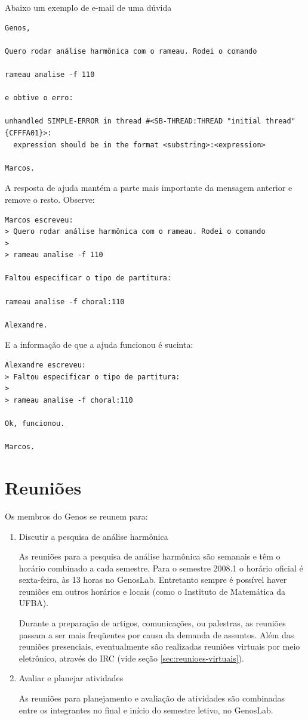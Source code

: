 \documentclass[12pt,brazil]{book}
\begin{document}
Abaixo um exemplo de e-mail de uma dúvida

\begin{verbatim}
Genos,

Quero rodar análise harmônica com o rameau. Rodei o comando

rameau analise -f 110

e obtive o erro:

unhandled SIMPLE-ERROR in thread #<SB-THREAD:THREAD "initial thread" {CFFFA01}>:
  expression should be in the format <substring>:<expression>

Marcos.
\end{verbatim}

A resposta de ajuda mantém a parte mais importante da mensagem
anterior e remove o resto. Observe:

\begin{verbatim}
Marcos escreveu:
> Quero rodar análise harmônica com o rameau. Rodei o comando
> 
> rameau analise -f 110

Faltou especificar o tipo de partitura:

rameau analise -f choral:110

Alexandre.
\end{verbatim}

E a informação de que a ajuda funcionou é sucinta:

\begin{verbatim}
Alexandre escreveu:
> Faltou especificar o tipo de partitura:
> 
> rameau analise -f choral:110

Ok, funcionou.

Marcos.
\end{verbatim}

\section{Reuniões}
\label{sec:reunioes}

Os membros do Genos se reunem para:

\begin{enumerate}
\item Discutir a pesquisa de análise harmônica

  As reuniões para a pesquisa de análise harmônica são semanais e têm
  o horário combinado a cada semestre. Para o semestre 2008.1 o
  horário oficial é sexta-feira, às 13 horas no GenosLab. Entretanto
  sempre é possível haver reuniões em outros horários e locais (como o
  Instituto de Matemática da UFBA).

  Durante a preparação de artigos, comunicações, ou palestras, as
  reuniões passam a ser mais freqüentes por causa da demanda de
  assuntos. Além das reuniões presenciais, eventualmente são
  realizadas reuniões virtuais por meio eletrônico, através do IRC
  (vide seção \ref{sec:reunioes-virtuais}).

\item Avaliar e planejar atividades

  As reuniões para planejamento e avaliação de atividades são
  combinadas entre os integrantes no final e início do semestre
  letivo, no GenosLab.

\end{enumerate}
\end{document}
